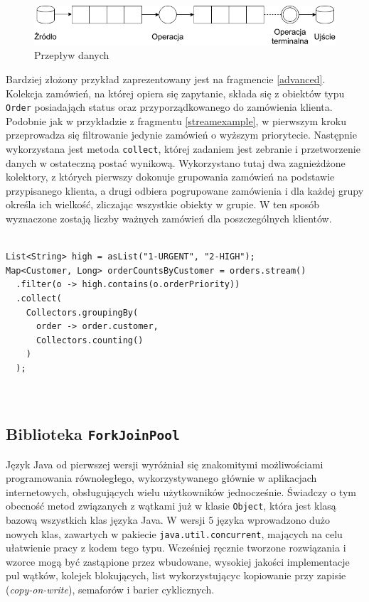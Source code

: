 \documentclass[12pt]{extarticle}
\begin{document}
\begin{figure}
\centering
\includegraphics[width=14cm]{flow.png}
\caption{Przepływ danych}
\label{fig:flow}
\end{figure}

    Bardziej złożony przykład zaprezentowany jest na fragmencie \ref{advanced}. Kolekcja zamówień, na której opiera się zapytanie, składa się z obiektów typu \texttt{Order} posiadająch status oraz przyporządkowanego do zamówienia klienta. Podobnie jak w przykładzie z fragmentu \ref{streamexample}, w pierwszym kroku przeprowadza się filtrowanie jedynie zamówień o wyższym priorytecie. Następnie wykorzystana jest metoda \texttt{collect}, której zadaniem jest zebranie i przetworzenie danych w ostateczną postać wynikową. Wykorzystano tutaj dwa zagnieżdżone kolektory, z których pierwszy dokonuje grupowania zamówień na podstawie przypisanego klienta, a drugi odbiera pogrupowane zamówienia i dla każdej grupy określa ich wielkość, zliczając wszystkie obiekty w grupie. W ten sposób wyznaczone zostają liczby ważnych zamówień dla poszczególnych klientów.

\begin{lstlisting}[label=advanced, caption=Zaawansowane wykorzystanie Stream API]

List<String> high = asList("1-URGENT", "2-HIGH");
Map<Customer, Long> orderCountsByCustomer = orders.stream()
  .filter(o -> high.contains(o.orderPriority))
  .collect(
    Collectors.groupingBy(
      order -> order.customer,
      Collectors.counting()
    )
  );
  
    

\end{lstlisting}

\subsection{Biblioteka \texttt{ForkJoinPool}}

    Język Java od pierwszej wersji wyróżniał się znakomitymi możliwościami programowania równoległego, wykorzystywanego głównie w aplikacjach internetowych, obsługujących wielu użytkowników jednocześnie. Świadczy o tym obecność metod związanych z wątkami już w klasie \texttt{Object}, która jest klasą bazową wszystkich klas języka Java. W wersji 5 języka wprowadzono dużo nowych klas, zawartych w pakiecie \texttt{java.util.concurrent}, mających na celu ułatwienie pracy z kodem tego typu. Wcześniej ręcznie tworzone rozwiązania i wzorce mogą być zastąpione przez wbudowane, wysokiej jakości implementacje pul wątków, kolejek blokujących, list wykorzystującyc kopiowanie przy zapisie (\textit{copy-on-write}), semaforów i barier cyklicznych.
    
\end{document}
